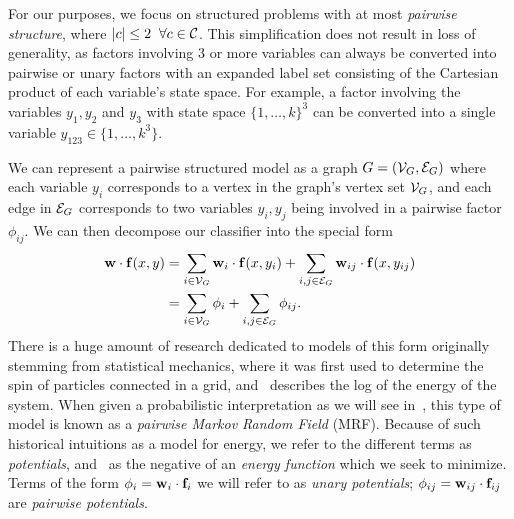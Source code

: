 For our purposes, we focus on structured problems with at most {\em pairwise 
structure}, where $|c| \leq 2\;\; \forall c \in \mathcal{C}$.  This simplification does 
not result in loss of generality, as factors involving 3 or more variables can 
always be converted into pairwise or unary factors with an expanded label set 
consisting of the Cartesian product of each variable's state space. For 
example, a factor involving the variables $y_1,y_2$ and $y_3$ with state space 
$\{1,\ldots,k\}^3$ can be converted into a single variable $y_{123} \in 
\{1,\ldots,k^3\}$.

We can represent a pairwise structured model as a graph $G = (\mathcal{V}_G,\mathcal{E}_G)$ where each variable $y_i$ corresponds to a vertex in the graph's vertex set $\mathcal{V}_G$, and each edge in $\mathcal{E}_G$ corresponds to two variables $y_i,y_j$ being involved in a pairwise factor $\phi_{ij}$.  We can then decompose our classifier into the special form
\begin{align}
\mathbf{w} \cdot \mathbf{f}(x,y) &= \sum_{i \in \mathcal{V}_G} \mathbf{w}_i \cdot \mathbf{f}(x,y_i) + \sum_{i,j \in \mathcal{E}_G} \mathbf{w}_{ij} \cdot \mathbf{f}(x,y_{ij}) \\
& = \sum_{i \in \mathcal{V}_G} \phi_i + \sum_{i,j \in \mathcal{E}_G} \phi_{ij}.
\label{eq:mrf}
\end{align} There is a huge amount of research dedicated to models of this form 
originally stemming from statistical mechanics, where it was first used to 
determine the spin of particles connected in a grid, and~ describes 
the log of the energy of the system.  When given a probabilistic interpretation 
as we will see in~, this type of model is known as a {\em 
pairwise Markov Random Field} (MRF).  Because of such historical intuitions as 
a model for energy, we refer to the different terms as {\em potentials}, 
and~ as the negative of an {\em energy function} which we seek to 
minimize.  Terms of the form $\phi_i = \mathbf{w}_i \cdot \mathbf{f}_i$ we will refer to as 
{\em unary potentials}; $\phi_{ij} = \mathbf{w}_{ij} \cdot \mathbf{f}_{ij}$ are {\em pairwise 
potentials}.

